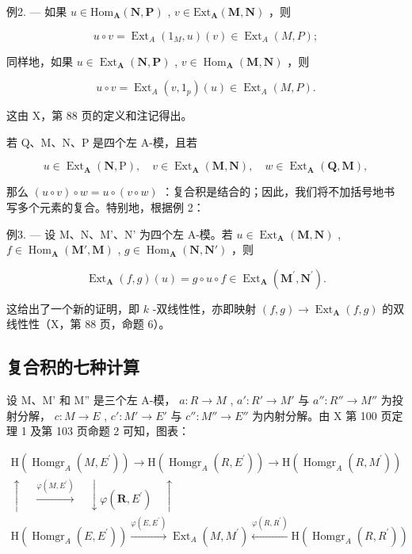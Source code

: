 例2. --- 如果 \(u \in \mathrm{Hom}_{\mathbf{A}}(\mathbf{N}, \mathbf{P})\) , \(v \in \mathrm{Ext}_{\mathbf{A}}(\mathbf{M}, \mathbf{N})\) ，则

\[
u \circ v = \operatorname{Ext} _ {A} (1 _ {M}, u) (v) \in \operatorname{Ext} _ {A} (M, P);
\]

同样地，如果 \(u \in \operatorname{Ext}_{\mathbf{A}}(\mathbf{N}, \mathbf{P})\) , \(v \in \operatorname{Hom}_{\mathbf{A}}(\mathbf{M}, \mathbf{N})\) ，则

\[
u \circ v = \operatorname{Ext} _ {A} (v, 1 _ {p}) (u) \in \operatorname{Ext} _ {A} (M, P).
\]

这由 X，第 88 页的定义和注记得出。

若 Q、M、N、P 是四个左 A-模，且若

\[
u \in \operatorname{Ext} _ {\mathbf {A}} (\mathbf {N}, \mathrm{P}), \quad v \in \operatorname{Ext} _ {\mathbf {A}} (\mathbf {M}, \mathbf {N}), \quad w \in \operatorname{Ext} _ {\mathbf {A}} (\mathbf {Q}, \mathbf {M}),
\]

那么 \((u \circ v) \circ w = u \circ (v \circ w)\) ：复合积是结合的；因此，我们将不加括号地书写多个元素的复合。特别地，根据例 2：

例3. — 设 M、N、M'、N' 为四个左 A-模。若 \(u \in \operatorname{Ext}_{\mathbf{A}}(\mathbf{M}, \mathbf{N})\) , \(f \in \operatorname{Hom}_{\mathbf{A}}(\mathbf{M}', \mathbf{M})\) , \(g \in \operatorname{Hom}_{\mathbf{A}}(\mathbf{N}, \mathbf{N}')\) ，则

\[
\operatorname{Ext} _ {\mathbf {A}} (f, g) (u) = g \circ u \circ f \in \operatorname{Ext} _ {\mathbf {A}} (\mathbf {M} ^ {\prime}, \mathbf {N} ^ {\prime}).\tag{3}
\]

这给出了一个新的证明，即 \(k\) -双线性性，亦即映射 \((f, g) \to \operatorname{Ext}_{\mathbf{A}}(f, g)\) 的双线性性（X，第 88 页，命题 6）。

\subsection{复合积的七种计算}

设 M、M' 和 M'' 是三个左 A-模， \(a : R \to M\) , \(a' : R' \to M'\) 与 \(a'' : R'' \to M''\) 为投射分解， \(c : M \to E\) , \(c' : M' \to E'\) 与 \(c'' : M'' \to E''\) 为内射分解。由 X 第 100 页定理 1 及第 103 页命题 2 可知，图表：

\[
\begin{array}{c} \mathrm{H} (\operatorname{Homgr} _ {A} (M, E ^ {\prime})) \xrightarrow {} \mathrm{H} (\operatorname{Homgr} _ {A} (R, E ^ {\prime})) \xrightarrow {} \mathrm{H} (\operatorname{Homgr} _ {A} (R, M ^ {\prime})) \\ \uparrow \quad \xrightarrow {\varphi (M , E ^ {\prime})} \quad \downarrow \varphi (\mathbf {R}, E ^ {\prime}) \quad \uparrow \\ \mathrm{H} (\operatorname{Homgr} _ {A} (E, E ^ {\prime})) \xrightarrow {\varphi (E , E ^ {\prime})} \operatorname{Ext} _ {A} (M, M ^ {\prime}) \xleftarrow {\varphi (R , R ^ {\prime})} \mathrm{H} (\operatorname{Homgr} _ {A} (R, R ^ {\prime})) \end{array}
\]

